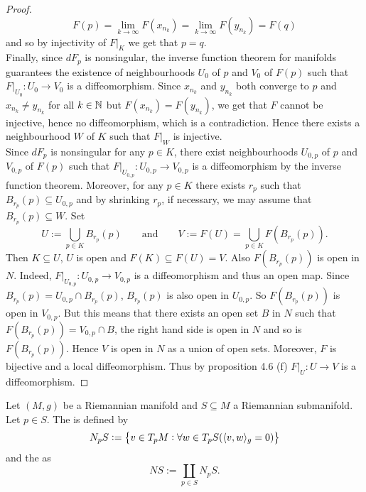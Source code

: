 \begin{proof}
	\begin{equation*}
		F(p) = \lim_{k \to \infty} F(x_{n_k}) = \lim_{k \to \infty}F(y_{n_k}) = F(q)
	\end{equation*}
	\noindent and so by injectivity of $F\vert_K$ we get that $p = q$.\\
	Finally, since $dF_p$ is nonsingular, the inverse function theorem for manifolds \cite[79]{lee:smooth_manifolds:2013} guarantees the existence of neighbourhoods $U_0$ of $p$ and $V_0$ of $F(p)$ such that $F\vert_{U_0} : U_0 \to V_0$ is a diffeomorphism. Since $x_{n_k}$ and $y_{n_k}$ both converge to $p$ and $x_{n_k} \neq y_{n_k}$ for all $k \in \mathbb{N}$ but $F(x_{n_k}) = F(y_{n_k})$, we get that $F$ cannot be injective, hence no diffeomorphism, which is a contradiction. Hence there exists a neighbourhood $W$ of $K$ such that $F\vert_W$ is injective.\\
	Since $dF_p$ is nonsingular for any $p \in K$, there exist neighbourhoods $U_{0,p}$ of $p$ and $V_{0,p}$ of $F(p)$ such that $F\vert_{U_{0,p}} : U_{0,p} \to V_{0,p}$ is a diffeomorphism by the inverse function theorem. Moreover, for any $p \in K$ there exists $r_p$ such that $B_{r_p}(p) \subseteq U_{0,p}$ and by shrinking $r_p$, if necessary, we may assume that $B_{r_p}(p) \subseteq W$. Set
	\begin{equation*}
		U := \bigcup_{p \in K} B_{r_p}(p) \qquad \text{and} \qquad V := F(U) = \bigcup_{p \in K} F(B_{r_p}(p)).
	\end{equation*}
	\noindent Then $K \subseteq U$, $U$ is open and $F(K) \subseteq F(U) = V$. Also $F(B_{r_p}(p))$ is open in $N$. Indeed, $F\vert_{U_{0,p}} : U_{0,p} \to V_{0,p}$ is a diffeomorphism and thus an open map. Since $B_{r_p}(p) = U_{0,p} \cap B_{r_p}(p)$, $B_{r_p}(p)$ is also open in $U_{0,p}$. So $F(B_{r_p}(p))$ is open in $V_{0,p}$. But this means that there exists an open set $B$ in $N$ such that $F(B_{r_p}(p)) = V_{0,p} \cap B$, the right hand side is open in $N$ and so is $F(B_{r_p}(p))$. Hence $V$ is open in $N$ as a union of open sets. Moreover, $F$ is bijective and a local diffeomorphism. Thus by proposition 4.6 (f) \cite[80]{lee:smooth_manifolds:2013} $F\vert_U : U \to V$ is a diffeomorphism.
\end{proof}

\begin{definition}
	Let $(M,g)$ be a Riemannian manifold and $S \subseteq M$ a Riemannian submanifold. Let $p \in S$. The  is defined by
	\begin{equation}
		N_pS := \cbr{v \in T_pM : \forall w \in T_pS(\langle v,w \rangle_g = 0) }
	\end{equation}
	\noindent and the  as
	\begin{equation}
		NS := \coprod_{p \in S} N_pS.
	\end{equation}
\end{definition}



